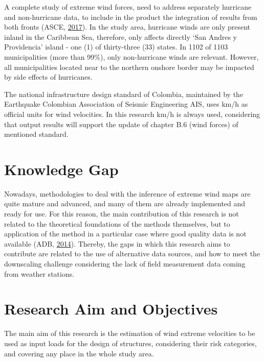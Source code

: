 \documentclass[12pt,oneside]{reedthesis}
\begin{document}
A complete study of extreme wind forces, need to address separately hurricane and non-hurricane data, to include in the product the integration of results from both fronts (ASCE, \protect\hyperlink{ref-Asce2017}{2017}). In the study area, hurricane winds are only present inland in the Caribbean Sea, therefore, only affects directly `San Andres y Providencia' island - one (1) of thirty-three (33) states. In 1102 of 1103 municipalities (more than 99\%), only non-hurricane winds are relevant. However, all municipalities located near to the northern onshore border may be impacted by side effects of hurricanes.

The national infrastructure design standard of Colombia, maintained by the Earthquake Colombian Association of Seismic Engineering AIS, uses km/h as official units for wind velocities. In this research km/h is always used, considering that output results will support the update of chapter B.6 (wind forces) of mentioned standard.

\hypertarget{knowledge-gap}{%
\section{Knowledge Gap}\label{knowledge-gap}}

Nowadays, methodologies to deal with the inference of extreme wind maps are quite mature and advanced, and many of them are already implemented and ready for use. For this reason, the main contribution of this research is not related to the theoretical foundations of the methods themselves, but to application of the method in a particular case where good quality data is not available (ADB, \protect\hyperlink{ref-windassessment}{2014}). Thereby, the gaps in which this research aims to contribute are related to the use of alternative data sources, and how to meet the downscaling challenge considering the lack of field measurement data coming from weather stations.

\hypertarget{research-aim-and-objectives}{%
\section{Research Aim and Objectives}\label{research-aim-and-objectives}}

The main aim of this research is the estimation of wind extreme velocities to be used as input loads for the design of structures, considering their risk categories, and covering any place in the whole study area.
\end{document}
